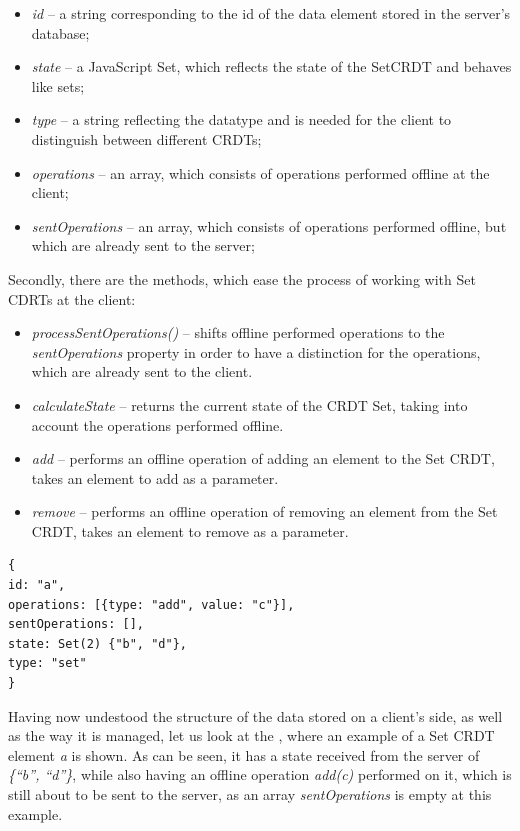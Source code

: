          \begin{itemize}
         \item \textit{id} -- a string corresponding to the id of the data element stored in the server's database;
         \item \textit{state} -- a JavaScript Set, which reflects the state of the SetCRDT and behaves like sets;
	\item \textit{type} -- a string reflecting the datatype and is needed for the client to distinguish between different CRDTs;
	\item \textit{operations} -- an array, which consists of operations performed offline at the client;
	\item \textit{sentOperations} -- an array, which consists of operations performed offline, but which are already sent to the server;
     \end{itemize}

Secondly, there are the methods, which ease the process of working with Set CDRTs at the client: 

         \begin{itemize}
         \item \textit{processSentOperations()} -- shifts offline performed operations to the \textit{sentOperations} property in order to have a distinction for the operations, which are already sent to the client.
         \item \textit{calculateState} -- returns the current state of the CRDT Set, taking into account the operations performed offline.
         \item \textit{add} -- performs an offline operation of adding an element to the Set CRDT, takes an element to add as a parameter.
          \item \textit{remove} -- performs an offline operation of removing an element from the Set CRDT, takes an element to remove as a parameter.
     \end{itemize}

\begin{lstlisting}[caption={An example of a Set CRDT stored on a client's side.}, label={lst:dev8}]
{
id: "a",
operations: [{type: "add", value: "c"}],
sentOperations: [],
state: Set(2) {"b", "d"},
type: "set"
}
\end{lstlisting}
     
Having now undestood the structure of the data stored on a client's side, as well as the way it is managed, let us look at the , where an example of a Set CRDT element \textit{a} is shown. As can be seen, it has a state received from the server of \textit{\{``b'', ``d''\}}, while also having an offline operation \textit{add(c)} performed on it, which is still about to be sent to the server, as an array \textit{sentOperations} is empty at this example.

